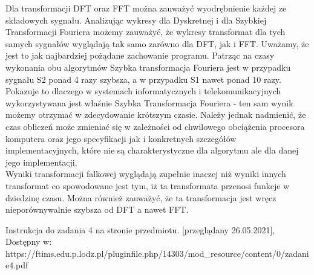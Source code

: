 \documentclass[12pt]{article}
\begin{document}
\indent Dla transformacji DFT oraz FFT można zauważyć wyodrębnienie każdej ze składowych sygnału. Analizując wykresy dla Dyskretnej i dla Szybkiej Transformacji Fouriera możemy zauważyć, że wykresy transformat dla tych samych sygnałów wyglądają tak samo zarówno dla DFT, jak i FFT. Uważamy, że jest to jak najbardziej pożądane zachowanie programu. Patrząc na czasy wykonania obu algorytmów Szybka transformacja Fouriera jest w przypadku sygnału S2 ponad 4 razy szybsza, a w przypadku S1 nawet ponad 10 razy. Pokazuje to dlaczego w systemach informatycznych i telekomunikacyjnych wykorzystywana jest właśnie Szybka Transformacja Fouriera - ten sam wynik możemy otrzymać w zdecydowanie krótszym czasie. Należy jednak nadmienić, że czas obliczeń może zmieniać się w zależności od chwilowego obciążenia procesora komputera oraz jego specyfikacji jak i konkretnych szczegółów implementacyjnych, które nie są charakterystyczne dla algorytmu ale dla danej jego implementacji.\\

\indent Wyniki transformacji falkowej wyglądają zupełnie inaczej niż wyniki innych transformat co spowodowane jest tym, iż ta transformata przenosi funkcje w dziedzinę czasu. Można również zauważyć, że ta transformacja jest wręcz nieporównywalnie szybsza od DFT a nawet FFT.

\begin{thebibliography}{}
 Instrukcja do zadania 4 na stronie przedmiotu. [przeglądany 26.05.2021], Dostępny w: https://ftims.edu.p.lodz.pl/pluginfile.php/14303/mod\_resource/content/0/zadanie4.pdf


\end{thebibliography}
\end{document}
